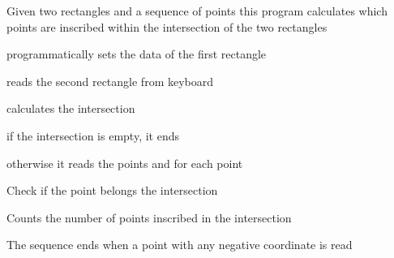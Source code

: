 Given two rectangles and a sequence of points this program calculates which points are inscribed within the intersection of the two rectangles
\begin{DoxyItemize}
\item programmatically sets the data of the first rectangle
\item reads the second rectangle from keyboard
\item calculates the intersection
\begin{DoxyItemize}
\item if the intersection is empty, it ends
\item otherwise it reads the points and for each point
\begin{DoxyItemize}
\item Check if the point belongs the intersection
\item Counts the number of points inscribed in the intersection
\item The sequence ends when a point with any negative coordinate is read 
\begin{DoxyCode}{0}
\DoxyCodeLine{ |     |                             |}
\DoxyCodeLine{ |     |    |                  |     |}
\DoxyCodeLine{ |     |    |                  |     |}
\DoxyCodeLine{ |     |    |                  |     |}
\DoxyCodeLine{ |     |    |                  |     |}
\DoxyCodeLine{ |     |    |                  |     |}
\DoxyCodeLine{ |     |    |                  |     |}
\DoxyCodeLine{ |     |                             |}
\DoxyCodeLine{ |     |                             |}
\DoxyCodeLine{ |}
\DoxyCodeLine{ |}
\DoxyCodeLine{}

\end{DoxyCode}
 
\end{DoxyItemize}
\end{DoxyItemize}
\end{DoxyItemize}